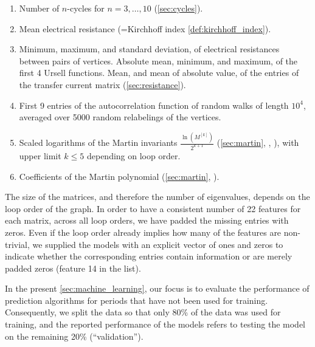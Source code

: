 \documentclass[12pt]{article}
\numberwithin{equation}{section}
\begin{document}
\begin{enumerate}
    \item Number of $n$-cycles for $n = 3, \dots, 10$ (\cref{sec:cycles}).
    \item Mean electrical resistance (=Kirchhoff index \cref{def:kirchhoff_index}). 
    \item Minimum, maximum, and standard deviation, of electrical resistances between pairs of vertices.  Absolute mean, minimum, and maximum, of the first 4 Ursell functions. Mean, and mean of absolute value, of the entries of the transfer current matrix (\cref{sec:resistance}).
    \item First 9 entries of the autocorrelation function of random walks of length $10^4$, averaged over 5000 random relabelings of the vertices.  
    \item Scaled logarithms of the Martin invariants $\frac{\ln (M^{[k]})}{2^{k+1}}$   (\cref{sec:martin}, \cite[Sec. 6.6]{balduf_statistics_2023}, \cite{panzer_feynman_2023}), with upper limit $k \leq 5$ depending on loop order.  
    \item Coefficients of the Martin polynomial (\cref{sec:martin}, \cite{panzer_feynman_2023}). 
\end{enumerate}

The size of the matrices, and therefore the number of eigenvalues, depends on the loop order of the graph. In order to have a consistent number of 22 features for each matrix, across all loop orders, we have padded the missing entries with zeros. Even if the loop order already implies how many of the features are non-trivial, we supplied the models with an explicit vector of ones and zeros to indicate whether the corresponding entries contain information or are merely padded zeros (feature 14 in the list). 


In the present \cref{sec:machine_learning}, our focus is to evaluate the performance of prediction algorithms for periods that have not been used for training. Consequently,  we split the data so that only 80\% of the data was used for training, and the reported performance of the models refers to testing the model on the remaining 20\% (\enquote{validation}). 
\end{document}
